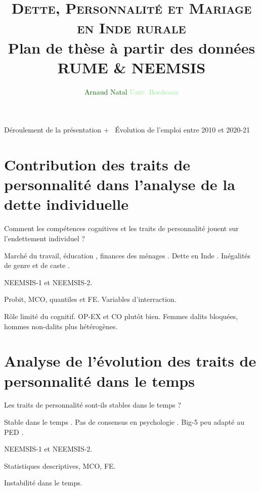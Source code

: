 \documentclass[aspectratio=169]{beamer}
\title[Plan de thèse]{\textsc{Dette, Personnalité et Mariage en Inde rurale} \\ Plan de thèse à partir des données RUME \& NEEMSIS}
\author[A. Natal]{\textcolor{darkgreen}{Arnaud Natal} \textcolor{lightgreen}{\scriptsize Univ. Bordeaux}}
\institute{| \small 20 octobre 2021}
\begin{document}
\maketitle



 \begin{frame}{Déroulement de la présentation}
   \tableofcontents
   + \faCommentsO ~Évolution de l'emploi entre 2010 et 2020-21
 \end{frame}


\section{Contribution des traits de personnalité dans l'analyse de la dette individuelle}
\begin{frame}{Comment les compétences cognitives et les traits de personnalité jouent sur l'endettement individuel ?}
    \begin{vfilleditems}
        \item[\faBook] Marché du travail, éducation \citep{Almlund2011}, finances des ménages \citep{Brown2014}. Dette en Inde \citep{Rajakumar2019, Guerin2014}. Inégalités de genre et de caste \citep{Sarkar2020}. 
        \item[\faDatabase] NEEMSIS-1 et NEEMSIS-2.
		\item[\faIndustry] Probit, MCO, quantiles et FE. Variables d'interraction.
		\item[\faGift] Rôle limité du cognitif. OP-EX et CO plutôt bien. Femmes dalits bloquées, hommes non-dalits plus hétérogènes.
    \end{vfilleditems}
\end{frame}


%




\section{Analyse de l'évolution des traits de personnalité dans le temps}
\begin{frame}{Les traits de personnalité sont-ils stables dans le temps ?}
    \begin{vfilleditems}
        \item[\faBook] Stable dans le temps \citep{CobbClark2012}. Pas de consensus en psychologie \citep{Ardelt2000}. Big-5 peu adapté au PED \citep{Laajaj2019}. 
        \item[\faDatabase] NEEMSIS-1 et NEEMSIS-2.
		\item[\faIndustry] Statistiques descriptives, MCO, FE.
		\item[\faGift] Instabilité dans le temps.
    \end{vfilleditems}
\end{frame}
\end{document}

